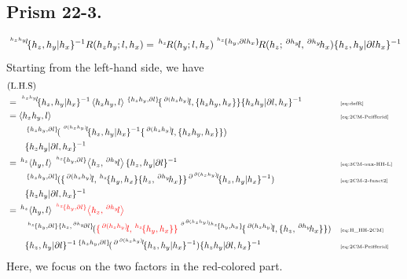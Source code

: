 \documentclass[11pt, reqno]{amsart} %
\newcommand{\act}[1]{\,\sp{#1}\!}
\newcommand{\red}[1]{\textcolor{red}{#1}}
\theoremstyle{definition}
\theoremstyle{remark}
\numberwithin{equation}{section}
\begin{document}
\subsection{Prism 22-3.}
\[
  \act{\act{h_zh_y}l}\{h_z,h_y|h_x\}^{-1}R(h_zh_y;l,h_x)
  = \act{h_z}R(h_y;l,h_x)\act{\act{h_z}\{h_y,\partial lh_x\}}R(h_z;\act{\partial h_y}l,\act{\partial h_y}h_x)\{h_z,h_y|\partial lh_x\}^{-1}
\]
Starting from the left-hand side, we have
\begin{align*}
  &(\text{L.H.S}) \\
  &= 
  \act{\act{h_zh_y}l}\{h_z,h_y|h_x\}^{-1}
  \left<h_zh_y,l\right>\act{\{h_zh_y,\partial l\}}\{\act{\partial (h_zh_y)}l,\{h_zh_y,h_x\}\}\{h_zh_y|\partial l,h_x\}^{-1} & &\text{\tiny \eqref{eq:defR}} \\
  &= 
  \left<h_zh_y,l\right>  &&\text{\tiny \eqref{eq:2CM-Peifferid}} \\
  &\qquad 
  \act{\{h_zh_y,\partial l\}}(\act{\act{\partial (h_zh_y)}l}\{h_z,h_y|h_x\}^{-1}\{\act{\partial (h_zh_y)}l,\{h_zh_y,h_x\}\}) \\
  &\qquad 
  \{h_zh_y|\partial l,h_x\}^{-1} \\
  &= 
  \act{h_z}\left<h_y,l\right>\act{\act{h_z}\{h_y,\partial l\}}\left<h_z,\act{\partial h_y}l\right>\{h_z,h_y|\partial l\}^{-1}  &&\text{\tiny \eqref{eq:3CM-aux-HH-L}} \\
  &\qquad 
  \act{\{h_zh_y,\partial l\}}(\{\act{\partial (h_zh_y)}l,\act{h_z}\{h_y,h_x\}\{h_z,\act{\partial h_y}h_x\}\}\act{\partial\act{\partial (h_zh_y)}l}\{h_z,h_y|h_x\}^{-1}) & &\text{\tiny \eqref{eq:2CM-2-funct2}} \\
  &\qquad 
  \{h_zh_y|\partial l,h_x\}^{-1} \\
  &= 
  \act{h_z}\left<h_y,l\right>\red{\act{\act{h_z}\{h_y,\partial l\}}\left<h_z,\act{\partial h_y}l\right>} \\
  &\qquad 
  \act{\act{h_z}\{h_y,\partial l\}\{h_z,\act{\partial h_y}\partial l\}}(\red{\{\act{\partial (h_zh_y)}l,\act{h_z}\{h_y,h_x\}\}}\act{\act{\partial \act{\partial (h_zh_y)}lh_z}\{h_y,h_x\}}\{\act{\partial (h_zh_y)}l,\{h_z,\act{\partial h_y}h_x\}\}) & &\text{\tiny \eqref{eq:H_HH-2CM}} \\
  &\qquad 
  \{h_z,h_y|\partial l\}^{-1}
  \act{\{h_zh_y,\partial l\}}(\act{\partial\act{\partial (h_zh_y)}l}\{h_z,h_y|h_x\}^{-1})
  \{h_zh_y|\partial l,h_x\}^{-1} & &\text{\tiny \eqref{eq:2CM-Peifferid}}
\end{align*}
Here, we focus on the two factors in the red-colored part. 
\end{document}
